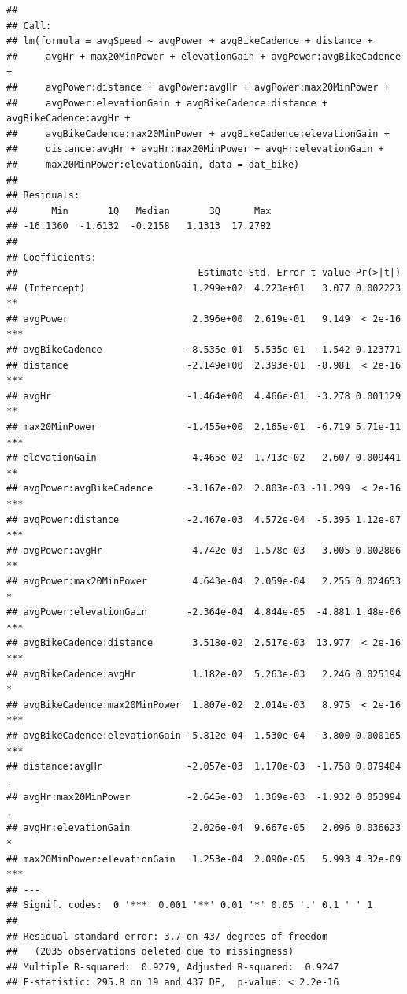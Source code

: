 \documentclass[
]{book}
\begin{document}
\begin{verbatim}
## 
## Call:
## lm(formula = avgSpeed ~ avgPower + avgBikeCadence + distance + 
##     avgHr + max20MinPower + elevationGain + avgPower:avgBikeCadence + 
##     avgPower:distance + avgPower:avgHr + avgPower:max20MinPower + 
##     avgPower:elevationGain + avgBikeCadence:distance + avgBikeCadence:avgHr + 
##     avgBikeCadence:max20MinPower + avgBikeCadence:elevationGain + 
##     distance:avgHr + avgHr:max20MinPower + avgHr:elevationGain + 
##     max20MinPower:elevationGain, data = dat_bike)
## 
## Residuals:
##      Min       1Q   Median       3Q      Max 
## -16.1360  -1.6132  -0.2158   1.1313  17.2782 
## 
## Coefficients:
##                                Estimate Std. Error t value Pr(>|t|)    
## (Intercept)                   1.299e+02  4.223e+01   3.077 0.002223 ** 
## avgPower                      2.396e+00  2.619e-01   9.149  < 2e-16 ***
## avgBikeCadence               -8.535e-01  5.535e-01  -1.542 0.123771    
## distance                     -2.149e+00  2.393e-01  -8.981  < 2e-16 ***
## avgHr                        -1.464e+00  4.466e-01  -3.278 0.001129 ** 
## max20MinPower                -1.455e+00  2.165e-01  -6.719 5.71e-11 ***
## elevationGain                 4.465e-02  1.713e-02   2.607 0.009441 ** 
## avgPower:avgBikeCadence      -3.167e-02  2.803e-03 -11.299  < 2e-16 ***
## avgPower:distance            -2.467e-03  4.572e-04  -5.395 1.12e-07 ***
## avgPower:avgHr                4.742e-03  1.578e-03   3.005 0.002806 ** 
## avgPower:max20MinPower        4.643e-04  2.059e-04   2.255 0.024653 *  
## avgPower:elevationGain       -2.364e-04  4.844e-05  -4.881 1.48e-06 ***
## avgBikeCadence:distance       3.518e-02  2.517e-03  13.977  < 2e-16 ***
## avgBikeCadence:avgHr          1.182e-02  5.263e-03   2.246 0.025194 *  
## avgBikeCadence:max20MinPower  1.807e-02  2.014e-03   8.975  < 2e-16 ***
## avgBikeCadence:elevationGain -5.812e-04  1.530e-04  -3.800 0.000165 ***
## distance:avgHr               -2.057e-03  1.170e-03  -1.758 0.079484 .  
## avgHr:max20MinPower          -2.645e-03  1.369e-03  -1.932 0.053994 .  
## avgHr:elevationGain           2.026e-04  9.667e-05   2.096 0.036623 *  
## max20MinPower:elevationGain   1.253e-04  2.090e-05   5.993 4.32e-09 ***
## ---
## Signif. codes:  0 '***' 0.001 '**' 0.01 '*' 0.05 '.' 0.1 ' ' 1
## 
## Residual standard error: 3.7 on 437 degrees of freedom
##   (2035 observations deleted due to missingness)
## Multiple R-squared:  0.9279,	Adjusted R-squared:  0.9247 
## F-statistic: 295.8 on 19 and 437 DF,  p-value: < 2.2e-16
\end{verbatim}
\end{document}
